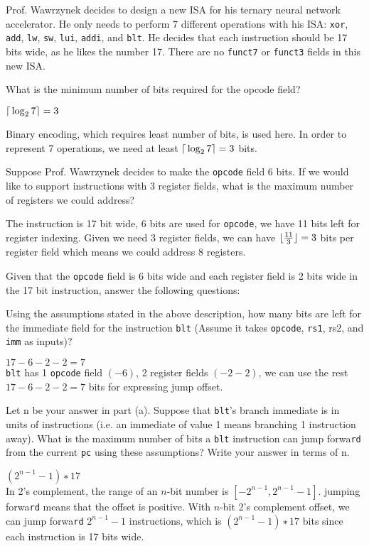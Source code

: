 \begin{blocksection}
Prof. Wawrzynek decides to design a new ISA for his ternary neural network accelerator. He only needs to perform 7 different operations with his ISA: \lstinline$xor$, \lstinline$add$, \lstinline$lw$, \lstinline$sw$, \lstinline$lui$, \lstinline$addi$, and \lstinline$blt$. He decides that each instruction should be 17 bits wide, as he likes the number 17. There are no \lstinline$funct7$ or \lstinline$funct3$ fields in this new ISA.

\question What is the minimum number of bits required for the opcode field?
\begin{solution}[0.7in]
$\lceil{} \log_2 7 \rceil{} = 3$

Binary encoding, which requires least number of bits, is used here. In order to represent 7 operations, we need at least $\lceil{} \log_2 7 \rceil{} = 3$ bits.
\end{solution}

\question
Suppose Prof. Wawrzynek decides to make the \lstinline$opcode$ field 6 bits. If we would like to support instructions with 3 register fields, what is the maximum number of registers we could address?
\begin{solution}[0.7in]
The instruction is 17 bit wide, 6 bits are used for \lstinline$opcode$, we have 11 bits left for register indexing. Given we need 3 register fields, we can have $\lfloor{} \frac{11}{3} \rfloor{} = 3$ bits per register field which means we could address 8 registers.
\end{solution}

Given that the \lstinline$opcode$ field is 6 bits wide and each register field is 2 bits wide in the 17 bit instruction, answer the following questions: 

\question
Using the assumptions stated in the above description, how many bits are left for the immediate field for the instruction \lstinline$blt$ (Assume it takes \lstinline$opcode$, \lstinline$rs1$, rs2, and \lstinline$imm$ as inputs)?
\begin{solution}[0.5in]
$17 - 6 - 2 - 2 = 7$ \\
\lstinline$blt$ has 1 \lstinline$opcode$ field $(-6)$, 2 register fields $(-2-2)$, we can use the rest $17-6-2-2 = 7$ bits for expressing jump offset.
\end{solution}

\question
Let n be your answer in part (a). Suppose that \lstinline$blt$’s branch immediate is in units of instructions (i.e. an immediate of value 1 means branching 1 instruction away). What is the maximum number of bits a \lstinline$blt$ instruction can jump forwa\lstinline$rd$ from the current \lstinline$pc$ using these assumptions? Write your answer in terms of n.
\begin{solution}[0.5in]
$(2^{n - 1} − 1) ∗ 17$ \\
In 2’s complement, the range of an $n$-bit number is $[−2^{n−1}, 2^{n−1} − 1]$. jumping forwa\lstinline$rd$ means that the offset is positive. With $n$-bit 2’s complement offset, we can jump forwa\lstinline$rd$ $2^{n−1} − 1$ instructions, which is $(2^{n−1} − 1) ∗ 17$ bits since each instruction is 17 bits wide.
\end{solution}


\end{blocksection}
